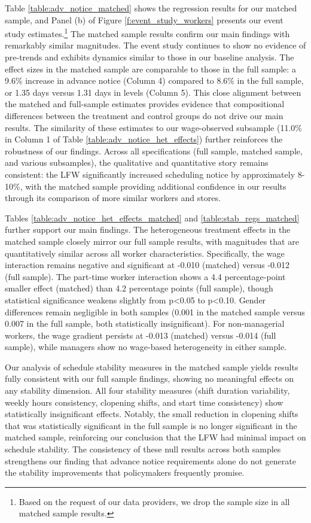 \documentclass[letterpaper,11pt,leqno]{article}
\theoremstyle{paper}
\begin{document}
Table \ref{table:adv_notice_matched} shows the regression results for our matched sample, and Panel (b) of Figure \ref{f:event_study_workers} presents our event study estimates.\footnote{Based on the request of our data providers, we drop the sample size in all matched sample results.} The matched sample results confirm our main findings with remarkably similar magnitudes. The event study continues to show no evidence of pre-trends and exhibits dynamics similar to those in our baseline analysis. The effect sizes in the matched sample are comparable to those in the full sample: a 9.6\% increase in advance notice (Column 4) compared to 8.6\% in the full sample, or 1.35 days versus 1.31 days in levels (Column 5). This close alignment between the matched and full-sample estimates provides evidence that compositional differences between the treatment and control groups do not drive our main results. The similarity of these estimates to our wage-observed subsample (11.0\% in Column 1 of Table \ref{table:adv_notice_het_effects}) further reinforces the robustness of our findings. Across all specifications (full sample, matched sample, and various subsamples), the qualitative and quantitative story remains consistent: the LFW significantly increased scheduling notice by approximately 8-10\%, with the matched sample providing additional confidence in our results through its comparison of more similar workers and stores.

Tables \ref{table:adv_notice_het_effects_matched} and \ref{table:stab_regs_matched} further support our main findings. The heterogeneous treatment effects in the matched sample closely mirror our full sample results, with magnitudes that are quantitatively similar across all worker characteristics. Specifically, the wage interaction remains negative and significant at -0.010 (matched) versus -0.012 (full sample). The part-time worker interaction shows a 4.4 percentage-point smaller effect (matched) than 4.2 percentage points (full sample), though statistical significance weakens slightly from p<0.05 to p<0.10. Gender differences remain negligible in both samples (0.001 in the matched sample versus 0.007 in the full sample, both statistically insignificant). For non-managerial workers, the wage gradient persists at -0.013 (matched) versus -0.014 (full sample), while managers show no wage-based heterogeneity in either sample. 

Our analysis of schedule stability measures in the matched sample yields results fully consistent with our full sample findings, showing no meaningful effects on any stability dimension. All four stability measures (shift duration variability, weekly hours consistency, clopening shifts, and start time consistency) show statistically insignificant effects. Notably, the small reduction in clopening shifts that was statistically significant in the full sample is no longer significant in the matched sample, reinforcing our conclusion that the LFW had minimal impact on schedule stability. The consistency of these null results across both samples strengthens our finding that advance notice requirements alone do not generate the stability improvements that policymakers frequently promise.
\end{document}

